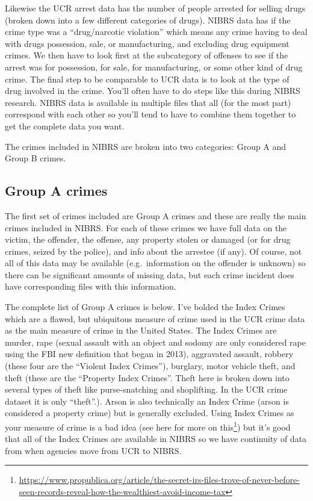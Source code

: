 \documentclass[
]{krantz}
\renewcommand{\href}[2]{#2\footnote{\url{#1}}}
\begin{document}
Likewise the UCR arrest data has the number of people
arrested for selling drugs (broken down into a few different
categories of drugs). NIBRS data has if the crime type was a
``drug/narcotic violation'' which means any crime having to
deal with drugs possession, sale, or manufacturing, and
excluding drug equipment crimes. We then have to look first
at the subcategory of offenses to see if the arrest was for
possession, for sale, for manufacturing, or some other kind
of drug crime. The final step to be comparable to UCR data
is to look at the type of drug involved in the crime. You'll
often have to do steps like this during NIBRS research.
NIBRS data is available in multiple files that all (for the
most part) correspond with each other so you'll tend to have
to combine them together to get the complete data you want.

The crimes included in NIBRS are broken into two categories:
Group A and Group B crimes.

\subsection{Group A crimes}\label{group-a-crimes}

The first set of crimes included are Group A crimes and
these are really the main crimes included in NIBRS. For each
of these crimes we have full data on the victim, the
offender, the offense, any property stolen or damaged (or
for drug crimes, seized by the police), and info about the
arrestee (if any). Of course, not all of this data may be
available (e.g.~information on the offender is unknown) so
there can be significant amounts of missing data, but each
crime incident does have corresponding files with this
information.

The complete list of Group A crimes is below. I've bolded
the Index Crimes which are a flawed, but ubiquitous measure
of crime used in the UCR crime data as the main measure of
crime in the United States. The Index Crimes are murder,
rape (sexual assault with an object and sodomy are only
considered rape using the FBI new definition that began in
2013), aggravated assault, robbery (these four are the
``Violent Index Crimes''), burglary, motor vehicle theft,
and theft (these are the ``Property Index Crimes''. Theft
here is broken down into several types of theft like
purse-snatching and shoplifting. In the UCR crime dataset it
is only ``theft''.). Arson is also technically an Index
Crime (arson is considered a property crime) but is
generally excluded. Using Index Crimes as your measure of
crime is a bad idea (see
\href{https://www.propublica.org/article/the-secret-irs-files-trove-of-never-before-seen-records-reveal-how-the-wealthiest-avoid-income-tax}{here
for more on this}) but it's good that all of the Index
Crimes are available in NIBRS so we have continuity of data
from when agencies move from UCR to NIBRS.
\end{document}
